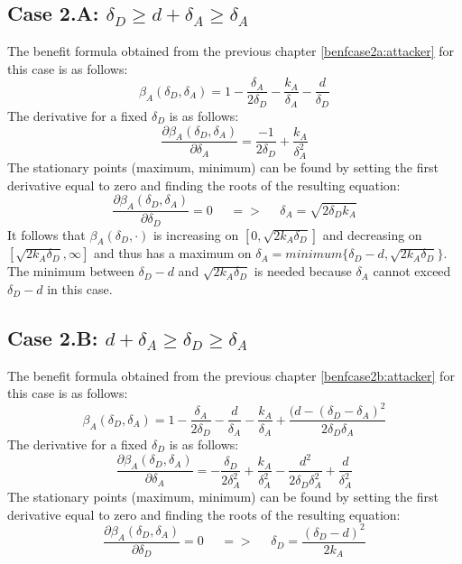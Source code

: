 \subsection*{Case 2.A: $\delta_{D} \geq d+\delta_{A} \geq \delta_{A} $ }
The benefit formula obtained from the previous chapter \ref{benfcase2a:attacker} for this case is as follows:
\begin{equation*}
\beta_{A}(\delta_{D},\delta_{A}) =1- \dfrac{\delta_{A}}{2\delta_{D}} - \dfrac{k_{A}}{\delta_{A}} - \dfrac{d}{\delta_{D}}
\end{equation*}
The derivative for a fixed $\delta_{D}$ is as follows:
\begin{equation*}
\dfrac{\partial \beta_{A}(\delta_{D},\delta_{A})}{\partial \delta_{A}} = \dfrac{-1}{2\delta_{D}} + \dfrac{k_{A}}{\delta_{A}^{2}}
\end{equation*}
The stationary points (maximum, minimum) can be found by setting the first derivative equal to zero and finding the roots of the resulting equation:
\begin{equation*}
\frac{\partial \beta_{A}(\delta_{D},\delta_{A})}{\partial \delta_{D}} =0 ~~~~~~ =>~~~~~~ \delta_{A} = \sqrt{2\delta_{D}k_{A}}
\end{equation*}
It follows that $\beta_{A}(\delta_{D},\cdot)$ is increasing on $[0,\sqrt{2k_{A}\delta_{D}}]$ and decreasing on $[\sqrt{2k_{A}\delta_{D}}, \infty]$ and thus has a maximum on $\delta_{A} = minimum \{\delta_{D} -d, \sqrt{2k_{A}\delta_{D}} \} $. The minimum between $\delta_{D}-d$ and $ \sqrt{2k_{A}\delta_{D}}$ is needed because $\delta_{A} $ cannot exceed $\delta_{D}-d$ in this case. \\

\subsection*{Case 2.B: $d+\delta_{A} \geq \delta_{D} \geq  \delta_{A} $} 

The benefit formula obtained from the previous chapter \ref{benfcase2b:attacker} for this case is as follows: 
\begin{equation*}
\beta_{A}(\delta_{D},\delta_{A}) = 1 - \dfrac{\delta_{A}}{2\delta_{D}} - \dfrac{d}{\delta_{A}} - \dfrac{k_{A}}{\delta_{A}} + \dfrac{(d-(\delta_{D}-\delta_{A})^{2}}{2\delta_{D}\delta_{A}} 
\end{equation*}
The derivative for a fixed $\delta_{D}$ is as follows:
\begin{equation*}
\dfrac{\partial \beta_{A}(\delta_{D},\delta_{A})}{\partial \delta_{A}} = -\dfrac{\delta_{D}}{2\delta_{A}^{2}} + \dfrac{k_{A}}{\delta_{A}^{2}} - \dfrac{d^{2}}{2\delta_{D}\delta_{A}^{2}} + \dfrac{d}{\delta_{A}^{2}}
\end{equation*}
The stationary points (maximum, minimum) can be found by setting the first derivative equal to zero and finding the roots of the resulting equation:
\begin{equation*}
\frac{\partial \beta_{A}(\delta_{D},\delta_{A})}{\partial \delta_{D}} =0 ~~~~~~ =>~~~~~~ \delta_{D}= \dfrac{(\delta_{D}-d)^{2}}{2k_{A}}
\end{equation*}


